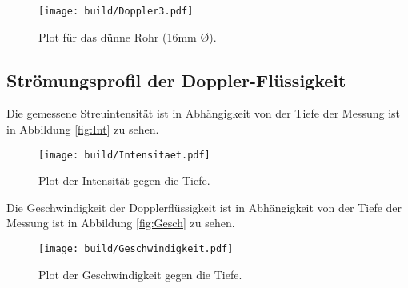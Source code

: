 \begin{figure}[H]
  \centering
  \texttt{[image: build/Doppler3.pdf]}
  \caption{Plot für das dünne Rohr (16mm \O).}
  \label{fig:Doppler3}
\end{figure}

\subsection{Strömungsprofil der Doppler-Flüssigkeit}
\label{sec:asdf}
Die gemessene Streuintensität ist in Abhängigkeit von der Tiefe der Messung ist in Abbildung \eqref{fig:Int} zu sehen.

\begin{figure}[H]
  \centering
  \texttt{[image: build/Intensitaet.pdf]}
  \caption{Plot der Intensität gegen die Tiefe.}
  \label{fig:Int}
\end{figure}

Die Geschwindigkeit der Dopplerflüssigkeit ist in Abhängigkeit von der Tiefe der Messung ist in Abbildung \eqref{fig:Gesch} zu sehen.

\begin{figure}[H]
  \centering
  \texttt{[image: build/Geschwindigkeit.pdf]}
  \caption{Plot der Geschwindigkeit gegen die Tiefe.}
  \label{fig:Gesch}
\end{figure}












%

